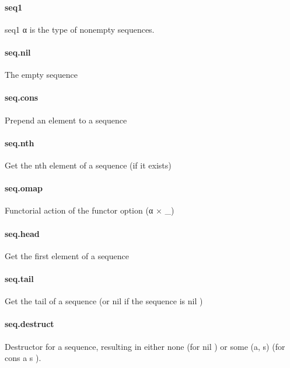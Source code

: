 \documentclass{article}
\begin{document}
\paragraph{seq1}
\par
\colorbox[RGB]{253,246,227}{{{{\color[RGB]{101, 123, 131} seq1 α }}}} is the type of nonempty sequences.
\paragraph{seq.nil}
\par
The empty sequence
\paragraph{seq.cons}
\par
Prepend an element to a sequence
\paragraph{seq.nth}
\par
Get the nth element of a sequence (if it exists)
\paragraph{seq.omap}
\par
Functorial action of the functor 
\colorbox[RGB]{253,246,227}{{{{\color[RGB]{101, 123, 131} option (α × \_) }}}}\paragraph{seq.head}
\par
Get the first element of a sequence
\paragraph{seq.tail}
\par
Get the tail of a sequence (or 
\colorbox[RGB]{253,246,227}{{{{\color[RGB]{101, 123, 131} nil }}}} if the sequence is 
\colorbox[RGB]{253,246,227}{{{{\color[RGB]{101, 123, 131} nil }}}})
\paragraph{seq.destruct}
\par
Destructor for a sequence, resulting in either 
\colorbox[RGB]{253,246,227}{{{{\color[RGB]{101, 123, 131} none }}}} (for 
\colorbox[RGB]{253,246,227}{{{{\color[RGB]{101, 123, 131} nil }}}}) or
\colorbox[RGB]{253,246,227}{{{{\color[RGB]{101, 123, 131} some (a, s) }}}} (for 
\colorbox[RGB]{253,246,227}{{{{\color[RGB]{101, 123, 131} cons a s }}}}).
\end{document}
